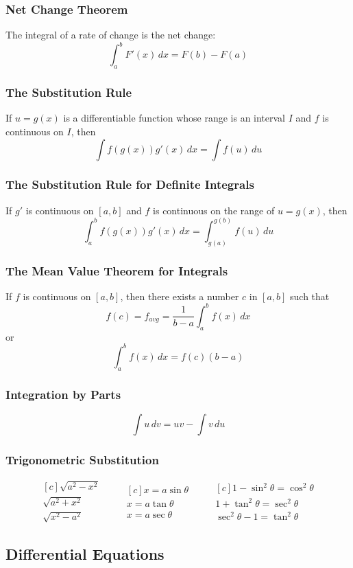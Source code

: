 \documentclass{article}
\begin{document}
\subsubsection*{Net Change Theorem}
The integral of a rate of change is the net change:
\[
\int_a^b F'(x) \, dx	= F(b) - F(a)
\]

\subsubsection*{The Substitution Rule}
If \(u=g(x)\) is a differentiable function whose range is an interval \(I\) and \(f\) is continuous on \(I\), then
\[
\int f(g(x))g'(x)\, dx = \int f(u)\, du
\]

\subsubsection*{The Substitution Rule for Definite Integrals}
If \(g'\) is continuous on \([a,b]\) and \(f\) is continuous on the range of \(u=g(x)\), then
\[
\int_a^b f(g(x))g'(x)\, dx = \int_{g(a)}^{g(b)} f(u)\, du
\]

\subsubsection*{The Mean Value Theorem for Integrals}
If \(f\) is continuous on \([a,b]\), then there exists a number \(c\) in \([a,b]\) such that 
\[
f(c) = f_{avg} = \frac{1}{b-a} \int_a^b f(x)\, dx
\]
or
\[
\int_a^b f(x)\, dx = f(c) (b - a)
\]

\subsubsection*{Integration by Parts}
\[
\int u\, dv = uv - \int v\, du
\]

\subsubsection*{Trigonometric Substitution}
\begin{equation*}
\begin{aligned}[c]
\sqrt{a^2 - x^2} \\
\sqrt{a^2 + x^2} \\
\sqrt{x^2 - a^2}
\end{aligned}
\qquad
\begin{aligned}[c]
x = a \sin \theta 	\\
x = a \tan \theta 	\\
x = a \sec \theta 	
\end{aligned}
\qquad
\begin{aligned}[c]
1 - \sin ^2 \theta = \cos ^2 \theta \\
1 + \tan ^2 \theta = \sec ^2 \theta \\
\sec ^2 \theta - 1 = \tan ^2 \theta
\end{aligned}
\end{equation*}

\subsection*{Differential Equations}
\end{document}
